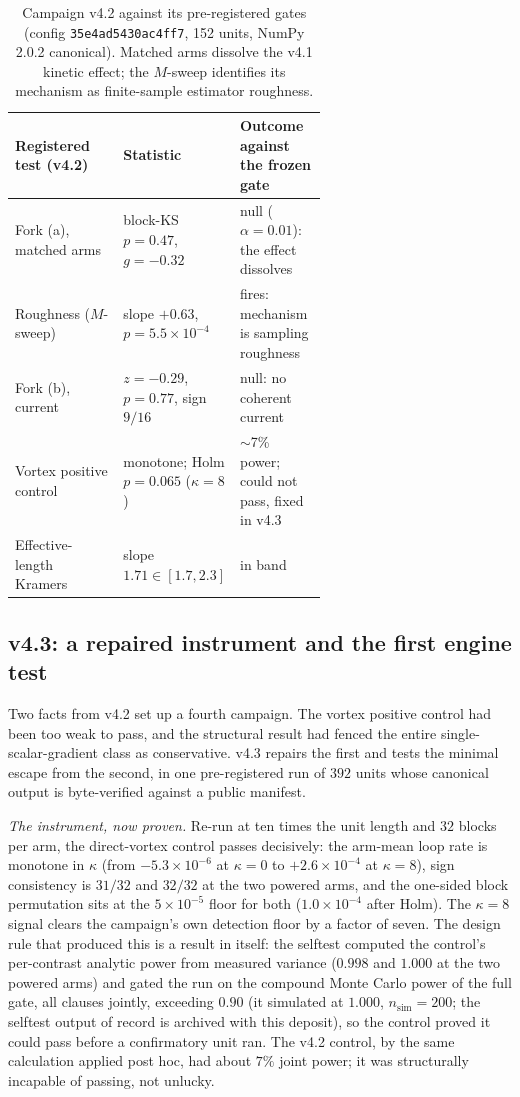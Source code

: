 \documentclass[11pt]{article}
\begin{document}
\begin{table}[t]\centering\small
\begin{tabular}{@{}l p{0.34\linewidth} p{0.28\linewidth}@{}}
\hline
Registered test (v4.2) & Statistic & Outcome against the frozen gate \\
\hline
Fork (a), matched arms & block-KS $p = 0.47$, $g = -0.32$ & null ($\alpha{=}0.01$): the effect dissolves \\
Roughness ($M$-sweep) & slope $+0.63$, $p = 5.5\times10^{-4}$ & fires: mechanism is sampling roughness \\
Fork (b), current & $z = -0.29$, $p = 0.77$, sign $9/16$ & null: no coherent current \\
Vortex positive control & monotone; Holm $p = 0.065$ ($\kappa{=}8$) & $\sim$7\% power; could not pass, fixed in v4.3 \\
Effective-length Kramers & slope $1.71 \in [1.7, 2.3]$ & in band \\
\hline
\end{tabular}
\caption{Campaign v4.2 against its pre-registered gates (config \texttt{35e4ad5430ac4ff7}, 152 units, NumPy 2.0.2 canonical). Matched arms dissolve the v4.1 kinetic effect; the $M$-sweep identifies its mechanism as finite-sample estimator roughness.}
\label{tab:v42}
\end{table}

\subsection{v4.3: a repaired instrument and the first engine test}\label{sec:v43}
Two facts from v4.2 set up a fourth campaign. The vortex positive control had been too weak to pass, and the structural result had fenced the entire single-scalar-gradient class as conservative. v4.3 repairs the first and tests the minimal escape from the second, in one pre-registered run of $392$ units whose canonical output is byte-verified against a public manifest.

\emph{The instrument, now proven.} Re-run at ten times the unit length and $32$ blocks per arm, the direct-vortex control passes decisively: the arm-mean loop rate is monotone in $\kappa$ (from $-5.3\times10^{-6}$ at $\kappa{=}0$ to $+2.6\times10^{-4}$ at $\kappa{=}8$), sign consistency is $31/32$ and $32/32$ at the two powered arms, and the one-sided block permutation sits at the $5\times10^{-5}$ floor for both ($1.0\times10^{-4}$ after Holm). The $\kappa{=}8$ signal clears the campaign's own detection floor by a factor of seven. The design rule that produced this is a result in itself: the selftest computed the control's per-contrast analytic power from measured variance ($0.998$ and $1.000$ at the two powered arms) and gated the run on the compound Monte Carlo power of the full gate, all clauses jointly, exceeding $0.90$ (it simulated at $1.000$, $n_{\mathrm{sim}}{=}200$; the selftest output of record is archived with this deposit), so the control proved it could pass before a confirmatory unit ran. The v4.2 control, by the same calculation applied post hoc, had about $7\%$ joint power; it was structurally incapable of passing, not unlucky.
\end{document}
